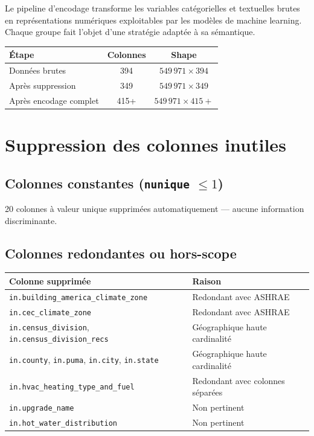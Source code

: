 \documentclass[11pt,a4paper]{article}
\begin{document}
Le pipeline d'encodage transforme les variables catégorielles et textuelles
brutes en représentations numériques exploitables par les modèles de machine
learning. Chaque groupe fait l'objet d'une stratégie adaptée à sa sémantique.

\begin{center}
\begin{tabular}{lcc}
\toprule
\textbf{Étape} & \textbf{Colonnes} & \textbf{Shape} \\
\midrule
\rowcolor{rowgray} Données brutes & 394 & $549\,971 \times 394$ \\
Après suppression & 349 & $549\,971 \times 349$ \\
\rowcolor{rowgray} Après encodage complet & 415+ & $549\,971 \times 415+$ \\
\bottomrule
\end{tabular}
\end{center}

\section{Suppression des colonnes inutiles}

\subsection{Colonnes constantes (\texttt{nunique} $\leq 1$)}
20 colonnes à valeur unique supprimées automatiquement — aucune information
discriminante.

\subsection{Colonnes redondantes ou hors-scope}

\begin{center}
\begin{tabular}{L{7cm}L{7cm}}
\toprule
\textbf{Colonne supprimée} & \textbf{Raison} \\
\midrule
{}
\texttt{in.building\_america\_climate\_zone} & Redondant avec ASHRAE \\
\texttt{in.cec\_climate\_zone} & Redondant avec ASHRAE \\
\texttt{in.census\_division}, \texttt{in.census\_division\_recs} & Géographique haute cardinalité \\
\texttt{in.county}, \texttt{in.puma}, \texttt{in.city}, \texttt{in.state} & Géographique haute cardinalité \\
\texttt{in.hvac\_heating\_type\_and\_fuel} & Redondant avec colonnes séparées \\
\texttt{in.upgrade\_name} & Non pertinent \\
\texttt{in.hot\_water\_distribution} & Non pertinent \\
\bottomrule
\end{tabular}
\end{center}
\end{document}
